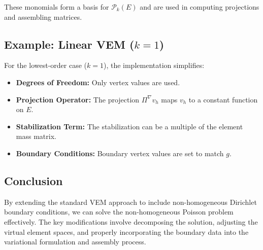 \documentclass[class=article, crop=false]{standalone}
\begin{document}
These monomials form a basis for $\mathcal{P}_k(E)$ and are used in computing projections and assembling matrices.

\subsection{Example: Linear VEM ($k = 1$)}

For the lowest-order case ($k = 1$), the implementation simplifies:

\begin{itemize}
    \item \textbf{Degrees of Freedom:} Only vertex values are used.
    \item \textbf{Projection Operator:} The projection $\Pi^\nabla v_h$ maps $v_h$ to a constant function on $E$.
    \item \textbf{Stabilization Term:} The stabilization can be a multiple of the element mass matrix.
    \item \textbf{Boundary Conditions:} Boundary vertex values are set to match $g$.
\end{itemize}

\subsection{Conclusion}

By extending the standard VEM approach to include non-homogeneous Dirichlet boundary conditions, we can solve the non-homogeneous Poisson problem effectively. The key modifications involve decomposing the solution, adjusting the virtual element spaces, and properly incorporating the boundary data into the variational formulation and assembly process.





\end{document}
